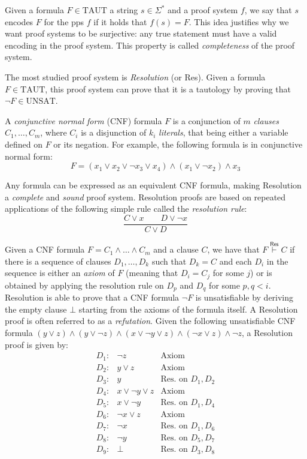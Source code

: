 Given a formula $F \in \mathrm{TAUT}$ a string $s \in \Sigma^*$ and a proof system $f$, we say that $s$ encodes $F$ for the pps $f$ if it holds that $f(s) = F$. This idea justifies why we want proof systems to be surjective: any true statement must have a valid encoding in the proof system. This property is called \textit{completeness} of the proof system.

The most studied proof system is \textit{Resolution} (or \textsf{Res}). Given a formula $F \in \mathrm{TAUT}$, this proof system can prove that it is a tautology by proving that $\lnot F \in \mathrm{UNSAT}$.

A \textit{conjunctive normal form} (CNF) formula $F$ is a conjunction of $m$ \textit{clauses} $C_1, \ldots, C_m$, where $C_i$ is a disjunction of $k_i$ \textit{literals}, that being either a variable defined on $F$ or its negation. For example, the following formula is in conjunctive normal form:
\[F = (x_1 \lor x_2 \lor \lnot{x_3} \lor x_4) \land (x_1 \lor \lnot{x_2}) \land x_3\]

Any formula can be expressed as an equivalent CNF formula, making Resolution a \textit{complete} and \textit{sound} proof system. Resolution proofs are based on repeated applications of the following simple rule called the \textit{resolution rule}:
\[\dfrac{C \lor x \qquad D \lor \lnot x}{C \lor D}\]

Given a CNF formula $F = C_1 \land \ldots \land C_m$ and a clause $C$, we have that $F \stackrel{\mathsf{Res}}{\vdash} C$ if there is a sequence of clauses $D_1, \ldots, D_k$ such that $D_k = C$ and each $D_i$ in the sequence is either an \textit{axiom} of $F$ (meaning that $D_i = C_j$ for some $j$) or is obtained by applying the resolution rule on $D_p$ and $D_q$ for some $p,q < i$. Resolution is able to prove that a CNF formula $\lnot F$ is unsatisfiable by deriving the empty clause $\bot$ starting from the axioms of the formula itself. A Resolution proof is often referred to as a \textit{refutation}. Given the following unsatisfiable CNF formula $(y \lor z) \land (y \lor \lnot{z}) \land (x \lor \lnot{y} \lor z) \land (\lnot{x} \lor z) \land \lnot{z}$, a Resolution proof is given by:
\[\begin{array}{lcl}
 D_1 :& \lnot{z} & \text{Axiom} \\
 D_2 :& y \lor z & \text{Axiom} \\
 D_3 :& y & \text{Res. on $D_1, D_2$} \\
 D_4 :& x \lor \lnot{y} \lor z  & \text{Axiom} \\
 D_5 :& x \lor \lnot{y} & \text{Res. on $D_1, D_4$} \\
 D_6 :& \lnot{x} \lor z & \text{Axiom} \\
 D_7 :& \lnot{x} & \text{Res. on $D_1, D_6$} \\
 D_8 :& \lnot{y} & \text{Res. on $D_5, D_7$} \\
 D_9 :& \bot & \text{Res. on $D_3, D_8$} \\
\end{array}\]

